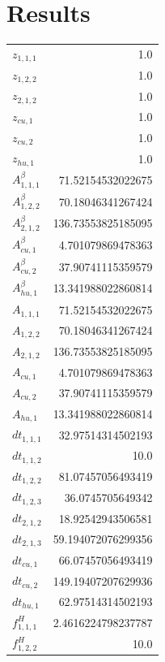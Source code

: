 \documentclass{article}%
\makeatletter
\let\mcnewpage=\newpage%
\newcommand{\TrickSupertabularIntoMulticols}{%
\renewcommand\newpage{%
\if@firstcolumn%
\hrule width\linewidth height0pt%
\columnbreak%
\else%
\mcnewpage%
\fi%
}%
}%
\makeatother
\begin{document}
\section{Results}%
\thispagestyle{plain}%
\begin{multicols*}{3}%
\TrickSupertabularIntoMulticols%
%
\begin{supertabular}{lr}%
	$z_{1,1,1}$ & 1.0 \\%
	$z_{1,2,2}$ & 1.0 \\%
	$z_{2,1,2}$ & 1.0 \\%
	$z_{cu,1}$ & 1.0 \\%
	$z_{cu,2}$ & 1.0 \\%
	$z_{hu,1}$ & 1.0 \\%
	$A_{1,1,1}^{\beta}$ & 71.52154532022675 \\%
	$A_{1,2,2}^{\beta}$ & 70.18046341267424 \\%
	$A_{2,1,2}^{\beta}$ & 136.73553825185095 \\%
	$A_{cu,1}^{\beta}$ & 4.701079869478363 \\%
	$A_{cu,2}^{\beta}$ & 37.90741115359579 \\%
	$A_{hu,1}^{\beta}$ & 13.341988022860814 \\%
	$A_{1,1,1}$ & 71.52154532022675 \\%
	$A_{1,2,2}$ & 70.18046341267424 \\%
	$A_{2,1,2}$ & 136.73553825185095 \\%
	$A_{cu,1}$ & 4.701079869478363 \\%
	$A_{cu,2}$ & 37.90741115359579 \\%
	$A_{hu,1}$ & 13.341988022860814 \\%
	$dt_{1,1,1}$ & 32.97514314502193 \\%
	$dt_{1,1,2}$ & 10.0 \\%
	$dt_{1,2,2}$ & 81.07457056493419 \\%
	$dt_{1,2,3}$ & 36.0745705649342 \\%
	$dt_{2,1,2}$ & 18.92542943506581 \\%
	$dt_{2,1,3}$ & 59.194072076299356 \\%
	$dt_{cu,1}$ & 66.07457056493419 \\%
	$dt_{cu,2}$ & 149.19407207629936 \\%
	$dt_{hu,1}$ & 62.97514314502193 \\%
	$f_{1,1,1}^{H}$ & 2.4616224798237787 \\%
	$f_{1,2,2}^{H}$ & 10.0 \\%

\end{supertabular}
\end{multicols*}
\end{document}
